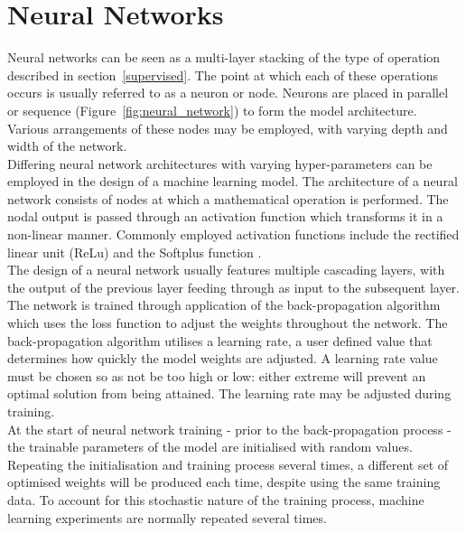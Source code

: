 \section{Neural Networks} \label{NN}




Neural networks can be seen as a multi-layer stacking of the type of operation described in section~\ref{supervised}. The point at which each of these operations occurs is usually referred to as a neuron or node. Neurons are placed in parallel or sequence (Figure~\ref{fig:neural_network}) to form the model architecture. Various arrangements of these nodes may be employed, with varying depth and width of the network. 
\\

\noindent
Differing neural network architectures with varying hyper-parameters \cite{gurney1997introduction} can be employed in the design of a machine learning model. The architecture of a neural network consists of nodes at which a mathematical operation is performed. The nodal output is passed through an activation function which transforms it in a non-linear manner. Commonly employed activation functions include the rectified linear unit (ReLu) \cite{hara2015analysis} and the Softplus function \cite{zheng2015improving}. 
\\

\noindent
The design of a neural network usually features multiple cascading layers, with the output of the previous layer feeding through as input to the subsequent layer. The network is trained through application of the back-propagation algorithm \cite{hecht1992theory} which uses the loss function to adjust the weights throughout the network. The back-propagation algorithm utilises a learning rate, a user defined value that determines how quickly the model weights are adjusted. A learning rate value must be chosen so as not be too high or low: either extreme will prevent an optimal solution from being attained. The learning rate may be adjusted during training. 
\\

\noindent
At the start of neural network training - prior to the back-propagation process - the trainable parameters of the model are initialised with random values. Repeating the initialisation and training process several times, a different set of optimised weights will be produced each time, despite using the same training data. To account for this stochastic nature of the training process, machine learning experiments are normally repeated several times.
\\

